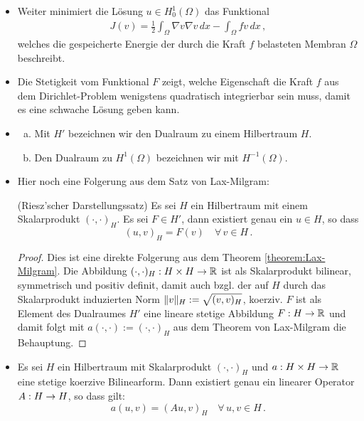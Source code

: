 \begin{itemize}
\item Weiter minimiert die Lösung $u \in H^1_0(\Omega)$ das Funktional
\begin{align*}
	J(v) = \frac 12 \int_\Omega \nabla v\nabla v \, dx - \int_\Omega fv \, dx \, ,
\end{align*}
welches die gespeicherte Energie der durch die Kraft $f$ belasteten Membran $\Omega$ beschreibt.

\item \begin{bem*}
Die Stetigkeit vom Funktional $F$ zeigt, welche Eigenschaft die Kraft $f$ aus dem Dirichlet-Problem wenigstens quadratisch integrierbar sein muss, damit es eine schwache Lösung geben kann.
\end{bem*}

\item \begin{bem*}
\begin{enumerate}[(a)]
\item Mit $H'$ bezeichnen wir den Dualraum zu einem Hilbertraum $H$.
\item Den Dualraum zu $H^1(\Omega)$ bezeichnen wir mit $H^{-1}(\Omega)$.
\end{enumerate}
\end{bem*}
\item Hier noch eine Folgerung aus dem Satz von Lax-Milgram:
\begin{satz}\textnormal{(Riesz'scher Darstellungssatz)}
Es sei $H$ ein Hilbertraum mit einem Skalarprodukt $(\cdot,\cdot)_H$. Es sei $F \in H'$, dann existiert genau ein $u \in H$, so dass
\[
	(u,v)_H = F(v) \quad \forall \, v \in H \, .
\]
\end{satz}

\begin{proof}
Dies ist eine direkte Folgerung aus dem Theorem \ref{theorem:Lax-Milgram}. Die Abbildung $(\cdot,\cdot)_H:H\times H \rightarrow \mathbb{R}$ ist als Skalarprodukt bilinear, symmetrisch und positiv definit, damit auch bzgl. der auf $H$ durch das Skalarprodukt induzierten Norm $\lVert v\rVert_H := \sqrt{(v,v)_H}$, koerziv. $F$ ist als Element des Dualraumes $H'$ eine lineare stetige Abbildung $F:H\rightarrow\mathbb{R}$ und damit folgt mit $a(\cdot,\cdot) :=(\cdot,\cdot)_H$ aus dem Theorem von Lax-Milgram die Behauptung.
\end{proof}

\item \begin{kor}\label{kor:2.14}
Es sei $H$ ein Hilbertraum mit Skalarprodukt $(\cdot,\cdot)_H$ und $a:H\times H\rightarrow \mathbb{R}$ eine stetige koerzive Bilinearform. Dann existiert genau ein linearer Operator $A : H \rightarrow H$, so dass gilt:
\[
	a(u,v)  = (Au,v)_H \quad \forall \, u , v \in H \, .
\]
\end{kor}


\end{itemize}

